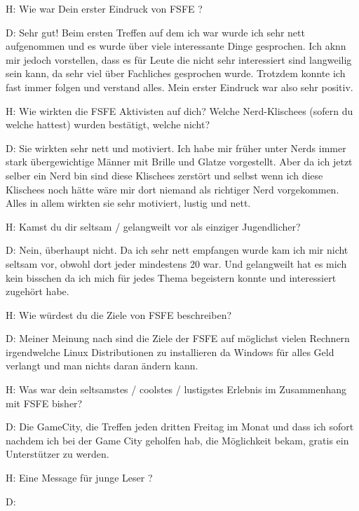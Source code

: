 H: Wie war Dein erster Eindruck von FSFE ?


D: Sehr gut! Beim ersten Treffen auf dem ich war wurde ich sehr nett aufgenommen und es wurde über viele interessante
   Dinge gesprochen. Ich aknn mir jedoch vorstellen, dass es für Leute die nicht sehr interessiert sind langweilig sein kann,
   da sehr viel über Fachliches gesprochen wurde. Trotzdem konnte ich fast immer folgen und verstand alles. Mein erster
   Eindruck war also sehr positiv.





H: Wie wirkten die FSFE Aktivisten auf dich? Welche Nerd-Klischees (sofern du welche hattest) wurden bestätigt, 
   welche nicht?


D: Sie wirkten sehr nett und motiviert. Ich habe mir früher unter Nerds immer stark übergewichtige Männer mit Brille und Glatze
   vorgestellt. Aber da ich jetzt selber ein Nerd bin sind diese Klischees zerstört und selbst wenn ich diese Klischees noch
   hätte wäre mir dort niemand als richtiger Nerd vorgekommen. Alles in allem wirkten sie sehr motiviert, lustig und nett.





H: Kamst du dir seltsam / gelangweilt vor als einziger Jugendlicher?


D: Nein, überhaupt nicht. Da ich sehr nett empfangen wurde kam ich mir nicht seltsam vor, obwohl dort jeder mindestens 20 war.
   Und gelangweilt hat es mich kein bisschen da ich mich für jedes Thema begeistern konnte und interessiert zugehört habe.





H: Wie würdest du die Ziele von FSFE beschreiben?


D: Meiner Meinung nach sind die Ziele der FSFE auf möglichst vielen Rechnern irgendwelche Linux Distributionen zu installieren
   da Windows für alles Geld verlangt und man nichts daran ändern kann.





H: Was war dein seltsamstes / coolstes / lustigstes Erlebnis im Zusammenhang mit FSFE bisher?


D: Die GameCity, die Treffen jeden dritten Freitag im Monat und dass ich sofort nachdem ich bei der Game City geholfen hab, die
   Möglichkeit bekam, gratis ein Unterstützer zu werden.





H: Eine Message für junge Leser ?


D: 




